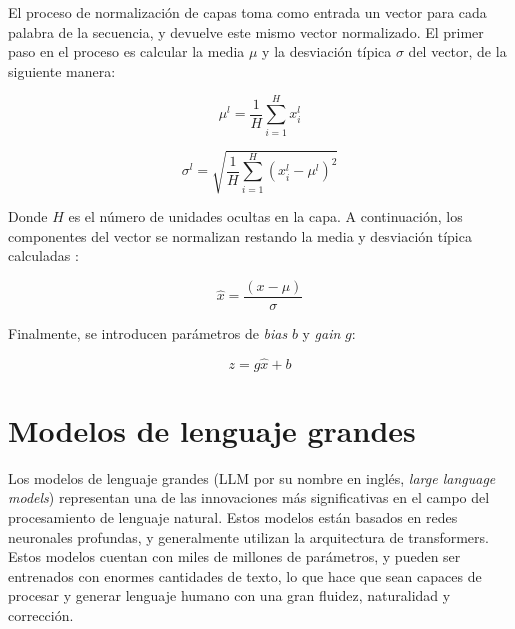 \documentclass[11pt,spanish,listoffigures,listoftables]{tfgetsinf}
\begin{document}
El proceso de normalización de capas toma como entrada un vector para cada palabra de la secuencia, y devuelve este mismo vector normalizado. El primer paso en el proceso es calcular la media $\mu$ y la desviación típica $\sigma$ del vector, de la siguiente manera:

\begin{equation}
\mu^l = \frac{1}{H} \sum_{i = 1}^Hx_i^l
\end{equation}

\begin{equation}
\sigma^l = \sqrt{\frac{1}{H} \sum_{i = 1}^H (x_i^l - \mu^l)^2}
\end{equation}

Donde $H$ es el número de unidades ocultas en la capa. A continuación, los componentes del vector se normalizan restando la media y desviación típica calculadas \cite{jurafsky2023speech}:

\begin{equation}
\hat{x} = \frac{(x - \mu)}{\sigma}
\end{equation}

Finalmente, se introducen parámetros de \textit{bias} $b$ y \textit{gain} $g$:

\begin{equation}
z = g\hat{x} + b
\end{equation}




\section{Modelos de lenguaje grandes} \label{modelosLenguajeGrandes}

Los modelos de lenguaje grandes (LLM por su nombre en inglés, \textit{large language models}) representan una de las innovaciones más significativas en el campo del procesamiento de lenguaje natural. Estos modelos están basados en redes neuronales profundas, y generalmente utilizan la arquitectura de transformers. Estos modelos cuentan con miles de millones de parámetros, y pueden ser entrenados con enormes cantidades de texto, lo que hace que sean capaces de procesar y generar lenguaje humano con una gran fluidez, naturalidad y corrección.
\end{document}
